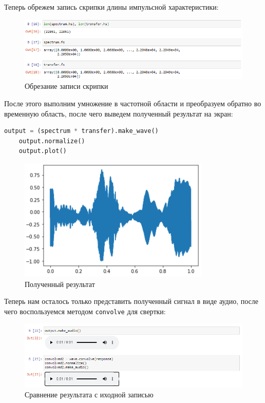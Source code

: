 \documentclass[a4paper]{article}
\begin{document}
            Теперь обрежем запись скрипки длины импульсной характеристики:
            
            \begin{figure}[H]
                \centering
                \includegraphics[width=\textwidth]{ex_2_5.png}
                \caption{Обрезание записи скрипки}
                \label{fig:ex_2_5}
            \end{figure}
            
            После этого выполним умножение в частотной области и преобразуем обратно во временную область, после чего выведем полученный результат на экран:
            
\begin{lstlisting}[language=Python, caption= Получение результата]
    output = (spectrum * transfer).make_wave()
    output.normalize()
    output.plot()
\end{lstlisting}
            
            \begin{figure}[H]
                \centering
                \includegraphics{ex_2_6.png}
                \caption{Полученный результат}
                \label{fig:ex_2_6}
            \end{figure}
            
            Теперь нам осталось только представить полученный сигнал в виде аудио, после чего воспользуемся методом \texttt{convolve} для свертки:
            
            \begin{figure}[H]
                \centering
                \includegraphics[width=\textwidth]{ex_2_7.png}
                \caption{Сравнение результата с иходной записью}
                \label{fig:ex_2_7}
            \end{figure}
            
\end{document}
